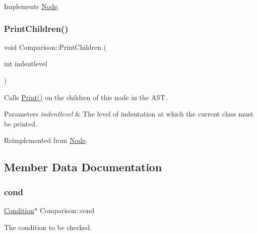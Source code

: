 Implements \hyperlink{class_node_a56e29657306ffb004d69c6929ae44269}{Node}.

\mbox{\label{class_comparison_a2c25039240b003ae6ac1e4d755ae1506}} 
\subsubsection{\texorpdfstring{Print\+Children()}{PrintChildren()}}
{\footnotesize\ttfamily void Comparison\+::\+Print\+Children (\begin{DoxyParamCaption}\item[{int}]{indentlevel }\end{DoxyParamCaption})\hspace{0.3cm}{\ttfamily [virtual]}}

Calls \hyperlink{class_node_a9ef727fd72d1a37792b3db60a8a479dd}{Print()} on the children of this node in the A\+ST. 
\begin{DoxyParams}{Parameters}
{\em indentlevel} & The level of indentation at which the current class must be printed. \\
\hline
\end{DoxyParams}


Reimplemented from \hyperlink{class_node_a3e67ec8d22182b721717af14fe0c3000}{Node}.



\subsection{Member Data Documentation}
\mbox{\label{class_comparison_a165789104c56602d693fc2ee7c6aa51f}} 
\subsubsection{\texorpdfstring{cond}{cond}}
{\footnotesize\ttfamily \hyperlink{class_condition}{Condition}$\ast$ Comparison\+::cond\hspace{0.3cm}{\ttfamily [protected]}}

The condition to be checked. \mbox{\label{class_comparison_a516dcc2bb9e7252455f0da7d0016cbb9}} 
